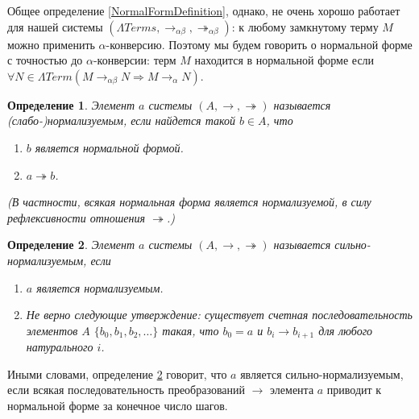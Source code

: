 \documentclass{article}[12pt]
\newtheorem{definition}{Определение}
\begin{document}
Общее определение \ref{NormalFormDefinition}, однако, не очень хорошо работает
для нашей системы $(\Lambda Terms, \rightarrow_{\alpha \beta}, \twoheadrightarrow_{\alpha \beta})$:
к любому замкнутому терму $M$ можно применить $\alpha$-конверсию. Поэтому мы будем говорить 
о нормальной форме с точностью до $\alpha$-конверсии: терм $M$ находится в нормальной форме
если $\forall N \in \Lambda Term (M \rightarrow_{\alpha \beta} N \Rightarrow M \rightarrow_\alpha N)$.

\begin{definition}
    \label{NormalizationDefinition}
    Элемент $a$ системы $(A, \rightarrow, \twoheadrightarrow)$ называется (слабо-)нормализуемым, если
    найдется такой $b \in A$, что 
    \begin{enumerate}
        \item $b$ является нормальной формой.
        \item $a \twoheadrightarrow b$.
    \end{enumerate}
    (В частности, всякая нормальная форма является нормализуемой, в силу рефлексивности отношения
    $\twoheadrightarrow$.)
\end{definition}

\begin{definition}
    \label{StrongNormalizationDefinition}
    Элемент $a$ системы $(A, \rightarrow, \twoheadrightarrow)$ называется сильно-нормализуемым,
    если
    \begin{enumerate}
        \item $a$ является нормализуемым.
        \item Не верно следующие утверждение: существует счетная последовательность
        элементов $A$ $\{ b_0, b_1, b_2, \dots \}$ такая, что $b_0 = a$ и 
        $b_i \rightarrow b_{i+1}$ для любого натурального $i$.
    \end{enumerate}
\end{definition}
Иными словами, определение \ref{StrongNormalizationDefinition} говорит, что $a$ является
сильно-нормализуемым, если всякая последовательность преобразований $\rightarrow$ элемента $a$ приводит
к нормальной форме за конечное число шагов.
\end{document}
